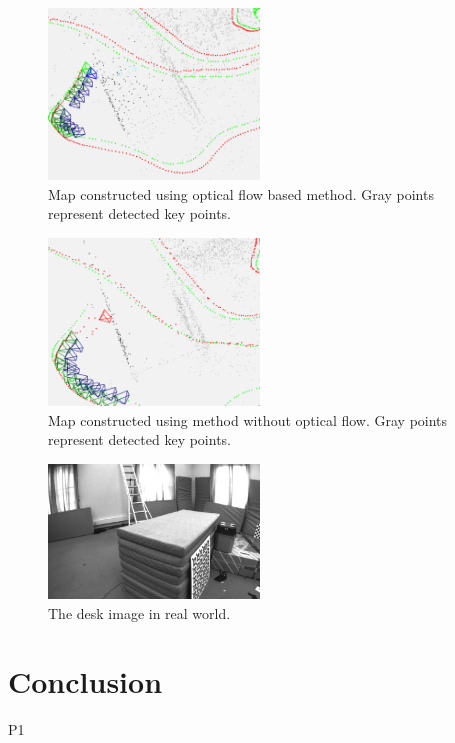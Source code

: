 \documentclass[conference]{IEEEtran}
\begin{document}
\begin{figure}
	\label{fig:optical_flow_desk}
	\centering
	\includegraphics[width=0.5\textwidth]{img/optical_flow_desk.png}
	\caption{Map constructed using optical flow based method. Gray points represent detected key points.}
\end{figure}

\begin{figure}
	\label{fig:key_point_desk}
	\centering
	\includegraphics[width=0.5\textwidth]{img/key_point_desk.png}
	\caption{Map constructed using method without optical flow. Gray points represent detected key points.}
\end{figure}


\begin{figure}
	\label{fig:desk}
	\centering
	\includegraphics[width=0.5\textwidth]{img/desk.png}
	\caption{The desk image in real world.}
\end{figure}




\section{Conclusion}
P1
\end{document}

